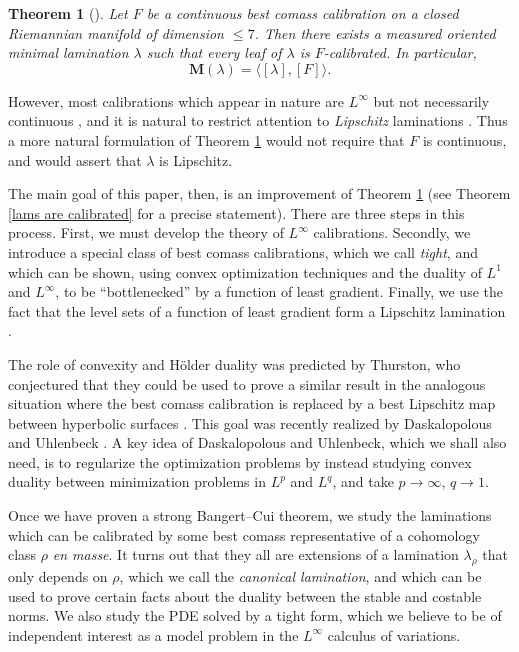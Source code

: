 \documentclass[reqno,11pt]{amsart}
\newcommand{\Mass}{\mathbf M}
\newcommand{\dfn}[1]{\emph{#1}\index{#1}}
\newtheorem{theorem}{Theorem}[section]
\theoremstyle{definition}
\numberwithin{equation}{section}
\begin{document}
\begin{theorem}[{\cite{bangert_cui_2017}}]\label{BangertCui}
Let $F$ be a continuous best comass calibration on a closed Riemannian manifold of dimension $\leq 7$.
Then there exists a measured oriented minimal lamination $\lambda$ such that every leaf of $\lambda$ is $F$-calibrated.
In particular, 
$$\Mass(\lambda) = \langle [\lambda], [F]\rangle.$$
\end{theorem}

However, most calibrations which appear in nature are $L^\infty$ but not necessarily continuous \cite[\S1]{bangert_cui_2017}, and it is natural to restrict attention to \emph{Lipschitz} laminations \cite[Remark 2.3]{bangert_cui_2017}.
Thus a more natural formulation of Theorem \ref{BangertCui} would not require that $F$ is continuous, and would assert that $\lambda$ is Lipschitz.

The main goal of this paper, then, is an improvement of Theorem \ref{BangertCui} (see Theorem \ref{lams are calibrated} for a precise statement).
There are three steps in this process.
First, we must develop the theory of $L^\infty$ calibrations.
Secondly, we introduce a special class of best comass calibrations, which we call \dfn{tight}, and which can be shown, using convex optimization techniques and the duality of $L^1$ and $L^\infty$, to be ``bottlenecked'' by a function of least gradient.
Finally, we use the fact that the level sets of a function of least gradient form a Lipschitz lamination \cite{BackusCML}.

The role of convexity and H\"older duality was predicted by Thurston, who conjectured that they could be used to prove a similar result in the analogous situation where the best comass calibration is replaced by a best Lipschitz map between hyperbolic surfaces \cite{Thurston98}.
This goal was recently realized by Daskalopolous and Uhlenbeck \cite{daskalopoulos2020transverse,daskalopoulos2022,daskalopoulos2023}.
A key idea of Daskalopolous and Uhlenbeck, which we shall also need, is to regularize the optimization problems by instead studying convex duality between minimization problems in $L^p$ and $L^q$, and take $p \to \infty$, $q \to 1$.

Once we have proven a strong Bangert--Cui theorem, we study the laminations which can be calibrated by some best comass representative of a cohomology class $\rho$ \emph{en masse}.
It turns out that they all are extensions of a lamination $\lambda_\rho$ that only depends on $\rho$, which we call the \dfn{canonical lamination}, and which can be used to prove certain facts about the duality between the stable and costable norms.
We also study the PDE solved by a tight form, which we believe to be of independent interest as a model problem in the $L^\infty$ calculus of variations.
\end{document}
